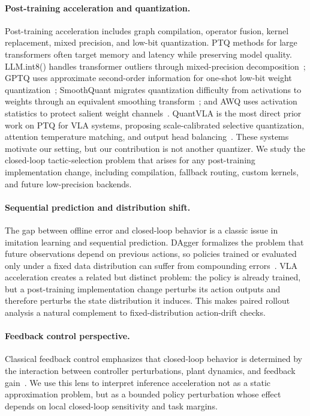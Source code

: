 \documentclass[10pt]{article}
\begin{document}
\paragraph{Post-training acceleration and quantization.}
Post-training acceleration includes graph compilation, operator fusion, kernel replacement, mixed precision, and low-bit quantization. PTQ methods for large transformers often target memory and latency while preserving model quality. LLM.int8() handles transformer outliers through mixed-precision decomposition~\citep{llmint8}; GPTQ uses approximate second-order information for one-shot low-bit weight quantization~\citep{gptq}; SmoothQuant migrates quantization difficulty from activations to weights through an equivalent smoothing transform~\citep{smoothquant}; and AWQ uses activation statistics to protect salient weight channels~\citep{awq}. QuantVLA is the most direct prior work on PTQ for VLA systems, proposing scale-calibrated selective quantization, attention temperature matching, and output head balancing~\citep{quantvla}. These systems motivate our setting, but our contribution is not another quantizer. We study the closed-loop tactic-selection problem that arises for any post-training implementation change, including compilation, fallback routing, custom kernels, and future low-precision backends.

\paragraph{Sequential prediction and distribution shift.}
The gap between offline error and closed-loop behavior is a classic issue in imitation learning and sequential prediction. DAgger formalizes the problem that future observations depend on previous actions, so policies trained or evaluated only under a fixed data distribution can suffer from compounding errors~\citep{dagger}. VLA acceleration creates a related but distinct problem: the policy is already trained, but a post-training implementation change perturbs its action outputs and therefore perturbs the state distribution it induces. This makes paired rollout analysis a natural complement to fixed-distribution action-drift checks.

\paragraph{Feedback control perspective.}
Classical feedback control emphasizes that closed-loop behavior is determined by the interaction between controller perturbations, plant dynamics, and feedback gain~\citep{astrom2008feedback}. We use this lens to interpret inference acceleration not as a static approximation problem, but as a bounded policy perturbation whose effect depends on local closed-loop sensitivity and task margins.
\end{document}
